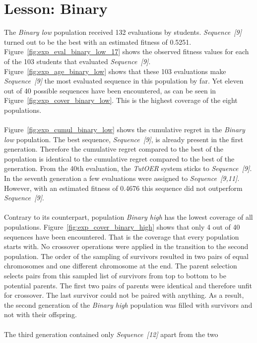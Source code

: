 \section{Lesson: Binary}
\label{sec:results_binary}
The \emph{Binary low} population received 132 evaluations by students.
\emph{Sequence~[9]} turned out to be the best with an estimated fitness of
0.5251. Figure~\ref{fig:exp_eval_binary_low_17} shows the observed fitness
values for each of the 103 students that evaluated \emph{Sequence~[9]}.
Figure~\ref{fig:exp_age_binary_low} shows that these 103 evaluations make
\emph{Sequence~[9]} the most evaluated sequence in this population by far. Yet
eleven out of 40 possible sequences have been encountered, as can be seen in
Figure~\ref{fig:exp_cover_binary_low}. This is the highest coverage of the
eight populations.\\\\
\noindent
Figure~\ref{fig:exp_cumul_binary_low} shows the cumulative regret in the
\emph{Binary low} population. The best sequence, \emph{Sequence~[9]}, is
already present in the first generation. Therefore the cumulative regret
compared to the best of the population is identical to the cumulative regret compared
to the best of the generation. From the 40th evaluation, the \emph{TutOER}
system sticks to \emph{Sequence~[9]}. In the seventh generation a few
evaluations were assigned to \emph{Sequence~[9,11]}. However, with an estimated
fitness of 0.4676 this sequence did not outperform \emph{Sequence~[9]}.\\\\
\noindent
Contrary to its counterpart, population \emph{Binary high} has the lowest
coverage of all populations. Figure~\ref{fig:exp_cover_binary_high} shows that
only 4 out of 40 sequences have been encountered. That is the coverage
that every population starts with. No crossover operations were applied in the
transition to the second population. The order of the sampling of survivors
resulted in two pairs of equal chromosomes and one different chromosome at the
end. The parent selection selects pairs from this sampled list of survivors
from top to bottom to be potential parents. The first two pairs of
parents were identical and therefore unfit for crossover. The last survivor
could not be paired with anything. As a result, the second generation of the
\emph{Binary high} population was filled with survivors and not with their
offspring.\\\\
\noindent
The third generation contained only \emph{Sequence~[12]} apart from the two
